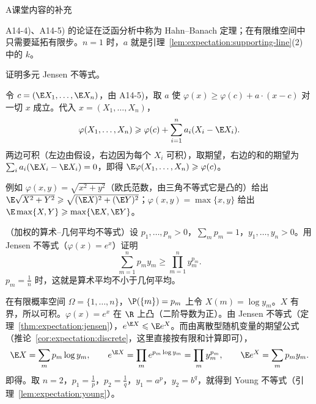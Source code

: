 \begin{exercises}{A}{课堂内容的补充}
\begin{questions}
\begin{solution}
A14-4)、A14-5) 的论证在泛函分析中称为 Hahn--Banach 定理；在有限维空间中只需要延拓有限步。$n=1$ 时，$a$ 就是引理~\ref{lem:expectation:supporting-line}(2) 中的 $k$。
\end{solution}
\item 证明多元 Jensen 不等式。
\begin{solution}
令 $c=(\E X_1,\dots,\E X_n)$，由 A14-5)，取 $a$ 使 $\varphi(x)\geqslant\varphi(c)+a\cdot(x-c)$ 对一切 $x$ 成立。代入 $x=(X_1,\dots,X_n)$，
\[
\varphi(X_1,\dots,X_n)\geqslant\varphi(c)+\sum_{i=1}^na_i(X_i-\E X_i).
\]
两边可积（左边由假设，右边因为每个 $X_i$ 可积），取期望，右边的和的期望为 $\sum_ia_i(\E X_i-\E X_i)=0$，即得 $\E\varphi(X_1,\dots,X_n)\geqslant\varphi(c)$。

例如 $\varphi(x,y)=\sqrt{x^2+y^2}$（欧氏范数，由三角不等式它是凸的）给出 $\E\sqrt{X^2+Y^2}\geqslant\sqrt{(\E X)^2+(\E Y)^2}$；$\varphi(x,y)=\max\{x,y\}$ 给出 $\E\max\{X,Y\}\geqslant\max\{\E X,\E Y\}$。
\end{solution}
\end{questions}

\item\label{ex:expectation:A15} （加权的算术--几何平均不等式）设 $p_1,\dots,p_n>0$，$\sum_mp_m=1$，$y_1,\dots,y_n>0$。用 Jensen 不等式（$\varphi(x)=e^x$）证明
\[
\sum_{m=1}^np_my_m\geqslant\prod_{m=1}^ny_m^{p_m}.
\]
$p_m=\frac1n$ 时，这就是算术平均不小于几何平均。
\begin{solution}
在有限概率空间 $\Omega=\{1,\dots,n\}$，$\P(\{m\})=p_m$ 上令 $X(m)=\log y_m$。$X$ 有界，所以可积。$\varphi(x)=e^x$ 在 $\R$ 上凸（二阶导数为正）。由 Jensen 不等式（定理~\ref{thm:expectation:jensen}），$e^{\E X}\leqslant \E e^X$。而由离散型随机变量的期望公式（推论~\ref{cor:expectation:discrete}，这里直接按有限和计算即可），
\[
\E X=\sum_mp_m\log y_m,\qquad e^{\E X}=\prod_me^{p_m\log y_m}=\prod_my_m^{p_m},\qquad \E e^X=\sum_mp_my_m .
\]
即得。取 $n=2$，$p_1=\frac1p$，$p_2=\frac1q$，$y_1=a^p$，$y_2=b^q$，就得到 Young 不等式（引理~\ref{lem:expectation:young}）。
\end{solution}
\end{exercises}

